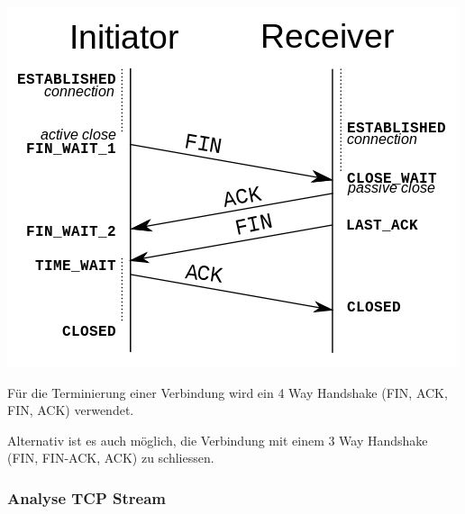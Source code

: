 \begin{minipage}[t]{.4\linewidth}
	\vspace{0pt}
	\includegraphics[width=\textwidth]{media/tcp_connection_closing.png}
\end{minipage}
\hspace{5mm}
\begin{minipage}[t]{.5\linewidth}
	\vspace{0pt}
	Für die Terminierung einer Verbindung wird ein 4 Way Handshake (FIN, ACK, FIN,
	ACK) verwendet.

	Alternativ ist es auch möglich, die Verbindung mit einem 3 Way Handshake (FIN,
	FIN-ACK, ACK) zu schliessen.
\end{minipage}


\subsubsection{Analyse TCP Stream}

